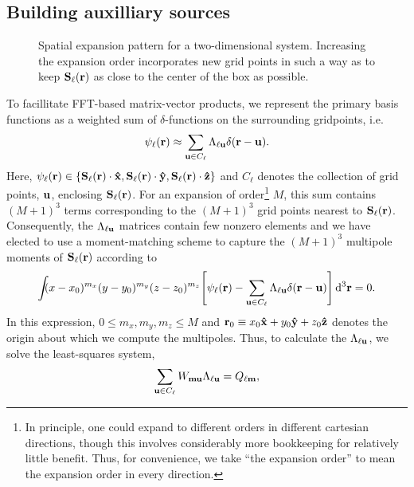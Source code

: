\subsection{Building auxilliary sources}

\begin{figure}
  \centering
  \caption{\label{fig:expansion grid}Spatial expansion pattern for a two-dimensional system.
    Increasing the expansion order incorporates new grid points in such a way as to keep $\vb{S}_\ell(\vb{r})$ as close to the center of the box as possible.
  }
\end{figure}

To facillitate FFT-based matrix-vector products, we represent the primary basis functions as a weighted sum of $\delta$-functions on the surrounding gridpoints, i.e.
\begin{equation}
  \psi_\ell(\vb{r}) \approx \sum_{\vb{u} \in C_{\ell}} \Lambda_{\ell\vb{u}} \delta(\vb{r} - \vb{u}).
  \label{eq:grid linear combination}
\end{equation}
Here, $\psi_\ell(\vb{r}) \in \qty{\vb{S}_\ell(\vb{r})\cdot \vu{x}, \vb{S}_\ell(\vb{r}) \cdot \vu{y}, \vb{S}_\ell(\vb{r}) \cdot \vu{z}}$ and $C_\ell$ denotes the collection of grid points, $\vb{u}$, enclosing $\vb{S}_\ell(\vb{r})$.
For an expansion of order\footnote{In principle, one could expand to different orders in different cartesian directions, though this involves considerably more bookkeeping for relatively little benefit. Thus, for convenience, we take ``the expansion order'' to mean the expansion order in every direction.} $M$, this sum contains $(M + 1)^3$ terms corresponding to the $(M + 1)^3$ grid points nearest to $\vb{S}_\ell(\vb{r})$.
Consequently, the $\Lambda_{\ell \vb{u}}$ matrices contain few nonzero elements and we have elected to use a moment-matching scheme to capture the $(M + 1)^3$ multipole moments of $\vb{S}_\ell(\vb{r})$ according to
\begin{equation}
  \int_{} (x - x_0)^{m_x}(y - y_0)^{m_y}(z - z_0)^{m_z} \qty[\psi_\ell(\vb{r}) - \sum_{\vb{u} \in C_\ell}\Lambda_{\ell\vb{u}}\delta(\vb{r} - \vb{u})] \dd[3]{\vb{r}} = 0.
  \label{eq:moment matching}
\end{equation}
In this expression, $0 \le m_x, m_y, m_z \le M$ and $\vb{r}_0 \equiv x_0 \vu{x} + y_0 \vu{y} + z_0\vu{z}$ denotes the origin about which we compute the multipoles.
Thus, to calculate the $\Lambda_{\ell \vb{u}}$, we solve the least-squares system,
\begin{equation}
  \sum_{\vb{u} \in C_\ell} W_{\vb{m}\vb{u}}\Lambda_{\ell\vb{u}} = Q_{\ell\vb{m}},
  \label{eq:expansion matrix system}
\end{equation}

